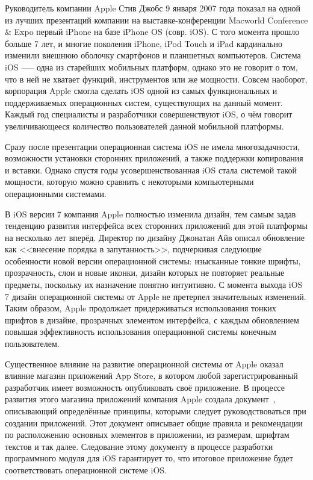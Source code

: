Руководитель компании Apple Стив Джобс 9 января 2007 года показал на одной
из лучших презентаций компании на выставке-конференции
Macworld Conference \& Expo первый iPhone на базе iPhone OS (совр. iOS).
С того момента прошло больше 7 лет, и многие поколения iPhone, iPod Touch и iPad
кардинально изменили внешнюю оболочку смартфонов и планшетных компьютеров.
Система iOS --— одна из старейших мобильных платформ, однако это не говорит о том,
что в ней не хватает функций, инструментов или же мощности.
Совсем наоборот, корпорация Apple смогла сделать iOS одной из самых функциональных
и поддерживаемых операционных систем, существующих на данный момент.
Каждый год специалисты и разработчики совершенствуют iOS,
о чём говорит увеличивающееся количество пользователей данной мобильной платформы.

Сразу после презентации операционная система iOS не имела многозадачности,
возможности установки сторонних приложений, а также поддержки копирования и вставки.
Однако спустя годы усовершенствованная iOS стала системой такой мощности,
которую можно сравнить с некоторыми компьютерными операционными системами.

В iOS версии 7 компания Apple полностью изменила дизайн,
тем самым задав тенденцию развития интерфейса всех сторонних приложений для этой
платформы на несколько лет вперёд. Директор по дизайну Джонатан Айв описал
обновление как <<внесение порядка в запутанность>>, подчеркивая следующие
особенности новой версии операционной системы: изысканные тонкие шрифты,
прозрачность, слои и новые иконки, дизайн которых не повторяет реальные предметы,
поскольку их назначение понятно интуитивно.
С момента выхода iOS 7 дизайн операционной системы от Apple не претерпел
значительных изменений. Таким образом, Apple продолжает придерживаться
использования тонких шрифтов в дизайне, прозрачных элементом интерфейса,
с каждым обновлением повышая эффективность использования операционной
системы конечным пользователем.

Существенное влияние на развитие операционной
системы от Apple оказал влияние магазин приложений App Store, в котором
любой зарегистрированный разработчик имеет возможность опубликовать своё
приложение. В процессе развития этого магазина приложений компания Apple
создала документ~\cite{ios_hig}, описывающий определённые принципы, которыми следует
руководствоваться при создании приложений. Этот документ описывает общие
правила и рекомендации по расположению основных элементов в приложении,
из размерам, шрифтам текстов и так далее.
Следование этому документу в процессе разработки программного модуля для iOS
гарантирует то, что итоговое приложение будет соответствовать
операционной системе iOS.

